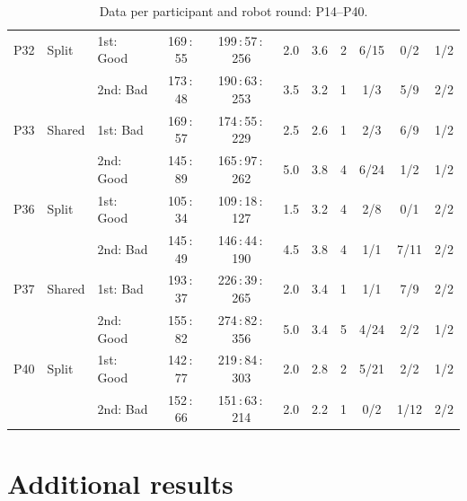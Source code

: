 \begin{table}[H]
\begin{tabular}{lllcccccccc}
P32 & Split & 1st: Good & 169\,:\,55 & 199\,:\,57\,:\,256 & 2.0 & 3.6 & 2 & 6/15 & 0/2 & 1/2 \\
 & & 2nd: Bad & 173\,:\,48 & 190\,:\,63\,:\,253 & 3.5 & 3.2 & 1 & 1/3 & 5/9 & 2/2 \\
\midrule
P33 & Shared & 1st: Bad & 169\,:\,57 & 174\,:\,55\,:\,229 & 2.5 & 2.6 & 1 & 2/3 & 6/9 & 1/2 \\
 & & 2nd: Good & 145\,:\,89 & 165\,:\,97\,:\,262 & 5.0 & 3.8 & 4 & 6/24 & 1/2 & 1/2 \\
\midrule
P36 & Split & 1st: Good & 105\,:\,34 & 109\,:\,18\,:\,127 & 1.5 & 3.2 & 4 & 2/8 & 0/1 & 2/2 \\
 & & 2nd: Bad & 145\,:\,49 & 146\,:\,44\,:\,190 & 4.5 & 3.8 & 4 & 1/1 & 7/11 & 2/2 \\
\midrule
P37 & Shared & 1st: Bad & 193\,:\,37 & 226\,:\,39\,:\,265 & 2.0 & 3.4 & 1 & 1/1 & 7/9 & 2/2 \\
 & & 2nd: Good & 155\,:\,82 & 274\,:\,82\,:\,356 & 5.0 & 3.4 & 5 & 4/24 & 2/2 & 1/2 \\
\midrule
P40 & Split & 1st: Good & 142\,:\,77 & 219\,:\,84\,:\,303 & 2.0 & 2.8 & 2 & 5/21 & 2/2 & 1/2 \\
 & & 2nd: Bad & 152\,:\,66 & 151\,:\,63\,:\,214 & 2.0 & 2.2 & 1 & 0/2 & 1/12 & 2/2 \\
\bottomrule
\end{tabular}
\caption{Data per participant and robot round: P14--P40.}
\label{tab:rawdata2}
\end{table}

\clearpage
\section{Additional results}
\label{app:results}

